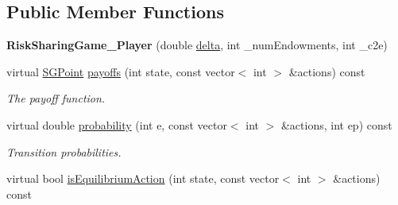 \subsection*{Public Member Functions}
\begin{DoxyCompactItemize}
\item 
\mbox{\label{classRiskSharingGame__3Player_aa04f71baa89e13f2411c27ec51d5ad44}} 
{\bfseries Risk\+Sharing\+Game\+\_\+Player} (double \hyperlink{classSGAbstractGame_a34c8905ac463bb2ec54aba4eb4ac376f}{delta}, int \+\_\+num\+Endowments, int \+\_\+c2e)
\item 
virtual \hyperlink{classSGPoint}{S\+G\+Point} \hyperlink{classRiskSharingGame__3Player_ae4a07f7dc66f18eccd29bc7993c0472f}{payoffs} (int state, const vector$<$ int $>$ \&actions) const
\begin{DoxyCompactList}\small\item\em The payoff function. \end{DoxyCompactList}\item 
virtual double \hyperlink{classRiskSharingGame__3Player_a48f478394bae9cf7479519da9b18a987}{probability} (int e, const vector$<$ int $>$ \&actions, int ep) const
\begin{DoxyCompactList}\small\item\em Transition probabilities. \end{DoxyCompactList}\item 
virtual bool \hyperlink{classRiskSharingGame__3Player_a79f44b04c558ecd72cf0b464fdd8a317}{is\+Equilibrium\+Action} (int state, const vector$<$ int $>$ \&actions) const
\end{DoxyCompactItemize}
